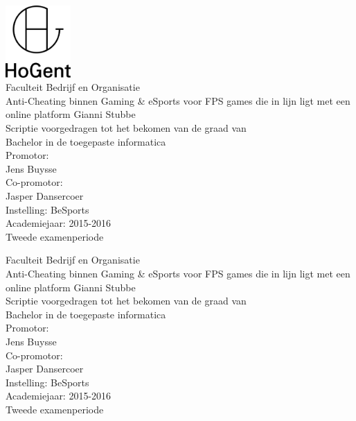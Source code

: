 \documentclass[pdftex,a4paper,12pt,twoside]{report}
\newcommand{\emptypage}{
\newpage
\thispagestyle{empty}
\mbox{}
\newpage
}
\newcommand{\student}{Gianni Stubbe}
\newcommand{\promotor}{Jens Buysse}
\newcommand{\copromotor}{Jasper Dansercoer}
\newcommand{\instelling}{BeSports}
\newcommand{\titel}{Anti-Cheating binnen Gaming \& eSports voor FPS games die in lijn ligt met een online platform}
\newcommand{\faculteit}{Faculteit Bedrijf en Organisatie}
\newcommand{\rapporttype}{Scriptie voorgedragen tot het bekomen van de graad van\\Bachelor in de toegepaste informatica}
\newcommand{\academiejaar}{2015-2016}
\newcommand{\examenperiode}{Tweede examenperiode}
\begin{document}

\begin{titlepage}
  \begin{center}

    \begingroup
    \rmfamily
    \includegraphics[width=2.5cm]{img/HG-beeldmerk-woordmerk}\\[.5cm]
    \faculteit\\[3cm]
    \titel
    \vfill
    \student\\[3.5cm]
    \rapporttype\\[2cm]
    Promotor:\\
    \promotor\\
    Co-promotor:\\
    \copromotor\\[2.5cm]
    Instelling: \instelling\\[.5cm]
    Academiejaar: \academiejaar\\[.5cm]
    \examenperiode
    \endgroup

  \end{center}
  \restoregeometry
\end{titlepage}


\emptypage


\begin{titlepage}
  \begin{center}

    \begingroup
    \rmfamily
    \faculteit\\[3cm]
    \titel
    \vfill
    \student\\[3.5cm]
    \rapporttype\\[2cm]
    Promotor:\\
    \promotor\\
    Co-promotor:\\
    \copromotor\\[2.5cm]
    Instelling: \instelling\\[.5cm]
    Academiejaar: \academiejaar\\[.5cm]
    \examenperiode
    \endgroup

  \end{center}
  \restoregeometry
\end{titlepage}
\end{document}

